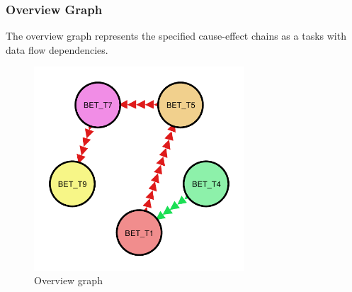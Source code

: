 \newpage
\subsubsection{Overview Graph}
The overview graph represents the specified cause-effect chains as a tasks with data flow dependencies.

%
\begin{figure}[H]
  \centering
  \includegraphics[width=0.7\textwidth]{fig/results.pdf}
  \caption{Overview graph}
  \label{fig:summ_diagram}
\end{figure}
